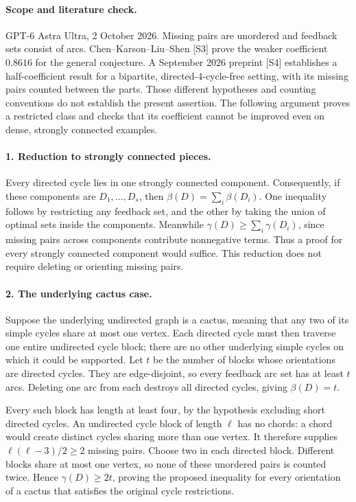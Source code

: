 \documentclass[11pt,a4paper]{article}
\begin{document}
\paragraph{Scope and literature check.}
GPT-6 Astra Ultra, 2 October 2026. Missing pairs are unordered and
feedback sets consist of arcs. Chen--Karson--Liu--Shen [S3] prove the
weaker coefficient $0.8616$ for the general conjecture. A September
2026 preprint [S4] establishes a half-coefficient result for a
bipartite, directed-4-cycle-free setting, with its missing pairs
counted between the parts. Those different hypotheses and counting
conventions do not establish the present assertion. The following
argument proves a restricted class and checks that its coefficient
cannot be improved even on dense, strongly connected examples.

\paragraph{1. Reduction to strongly connected pieces.}
Every directed cycle lies in one strongly connected component.
Consequently, if these components are $D_1,\ldots,D_s$, then
$\beta(D)=\sum_i\beta(D_i)$. One inequality follows by restricting
any feedback set, and the other by taking the union of optimal sets
inside the components. Meanwhile $\gamma(D)\ge\sum_i\gamma(D_i)$,
since missing pairs across components contribute nonnegative terms.
Thus a proof for every strongly connected component would suffice.
This reduction does not require deleting or orienting missing pairs.

\paragraph{2. The underlying cactus case.}
Suppose the underlying undirected graph is a cactus, meaning that any
two of its simple cycles share at most one vertex. Each directed cycle
must then traverse one entire undirected cycle block; there are no
other underlying simple cycles on which it could be supported.
Let $t$ be the number of blocks whose orientations are directed cycles.
They are edge-disjoint, so every feedback arc set has at least $t$
arcs. Deleting one arc from each destroys all directed cycles, giving
$\beta(D)=t$.

Every such block has length at least four, by the hypothesis excluding
short directed cycles. An undirected cycle block of length $\ell$
has no chords: a chord would create distinct cycles sharing more than
one vertex. It therefore supplies $\ell(\ell-3)/2\ge2$ missing pairs.
Choose two in each directed block. Different blocks share at most one
vertex, so none of these unordered pairs is counted twice. Hence
$\gamma(D)\ge2t$, proving the proposed inequality for every orientation
of a cactus that satisfies the original cycle restrictions.
\end{document}
